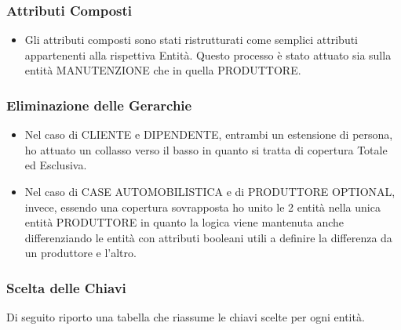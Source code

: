 \documentclass[11pt]{article}
\begin{document}
\subsubsection{Attributi Composti}
\begin{itemize}
    \item Gli attributi composti sono stati ristrutturati come semplici
    attributi appartenenti alla rispettiva Entità. Questo processo è stato
    attuato sia sulla entità MANUTENZIONE che in quella PRODUTTORE.
\end{itemize}

\subsubsection{Eliminazione delle Gerarchie}

\begin{itemize}
    \item Nel caso di CLIENTE e DIPENDENTE, entrambi un estensione di persona,
    ho attuato un collasso verso il basso in quanto si tratta di copertura
    Totale ed Esclusiva.
    \item Nel caso di CASE AUTOMOBILISTICA e di PRODUTTORE OPTIONAL, invece,
    essendo una copertura sovrapposta ho unito le 2 entità nella unica entità
    PRODUTTORE in quanto la logica viene mantenuta anche differenziando le
    entità con attributi booleani utili a definire la differenza da un produttore e
    l'altro.
\end{itemize}

\subsubsection{Scelta delle Chiavi}

Di seguito riporto una tabella che riassume le chiavi scelte per ogni entità.
\end{document}
